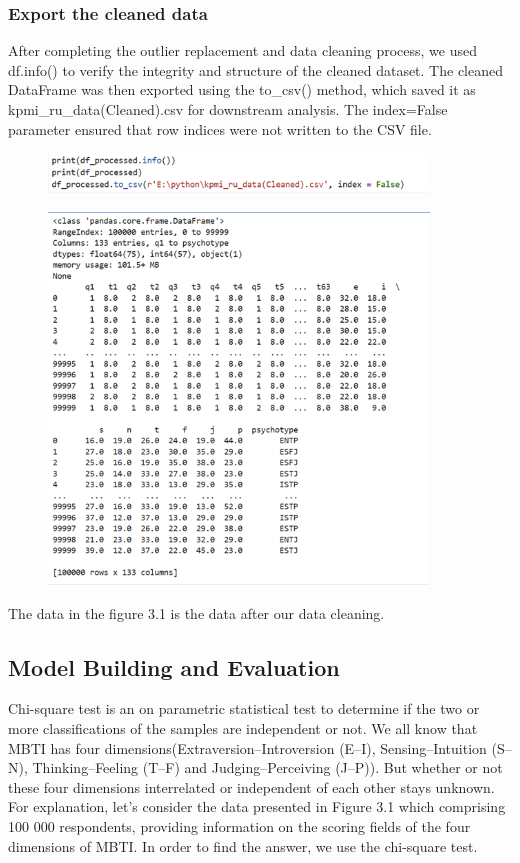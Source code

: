 \documentclass[12pt]{article}
\begin{document}
	\subsubsection{Export the cleaned data}
	After completing the outlier replacement and data cleaning process, we used df.info() to verify the integrity and structure of the cleaned dataset. The cleaned DataFrame was then exported using the to\_csv() method, which saved it as kpmi\_ru\_data(Cleaned).csv for downstream analysis. The index=False parameter ensured that row indices were not written to the CSV file.
	\begin{figure}[H]
		\centering
		\includegraphics[width=0.9\textwidth]{Q1P6}
		
	\end{figure}
	\begin{figure}[H]
		\centering
		\includegraphics[width=0.9\textwidth]{Q1P7}
		
	\end{figure}
	The data in the figure 3.1 is the data after our data cleaning.
	
	\subsection{Model Building and Evaluation}
	Chi-square test is an on parametric statistical test to determine if the two or more classifications of the samples are independent or not\cite{zibran2007chi}. We all know that MBTI has four dimensions(Extraversion–Introversion (E–I), Sensing–Intuition (S–N), Thinking–Feeling (T–F) and Judging–Perceiving (J–P)). But whether or not these four dimensions interrelated or independent of each other stays unknown. For explanation, let’s consider the data presented in Figure 3.1 which comprising 100 000 respondents, providing information on the scoring fields of the four dimensions of MBTI. In order to find the answer, we use the chi-square test.
	
\end{document}
